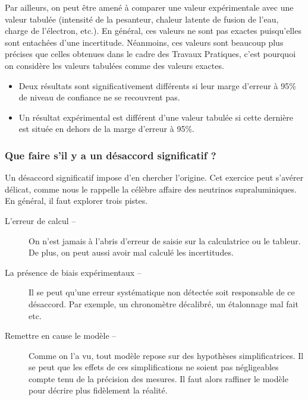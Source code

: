 Par ailleurs, on peut être amené à comparer une valeur expérimentale avec une valeur tabulée (intensité de la pesanteur, chaleur latente de fusion de l'eau, charge de l'électron, etc.). En général, ces valeurs ne sont pas exactes puisqu'elles sont entachées d'une incertitude. Néanmoins, ces valeurs sont beaucoup plus précises que celles obtenues dans le cadre des Travaux Pratiques, c'est pourquoi on considère les valeurs tabulées comme des valeurs exactes.
\begin{kaobox}[frametitle=À retenir]
\begin{itemize}
	\item Deux résultats sont significativement différents si leur marge d'erreur à 95\% de niveau de confiance ne se recouvrent pas.
	\item Un résultat expérimental est différent d'une valeur tabulée si cette dernière est située en dehors de la marge d'erreur à 95\%.
\end{itemize}
\end{kaobox}



\subsubsection{Que faire s'il y a un désaccord significatif ?}
Un désaccord significatif impose d'en chercher l'origine. Cet exercice peut s'avérer délicat, comme nous le rappelle la célèbre affaire des neutrinos supraluminiques. En général, il faut explorer trois pistes.
\begin{description}
	\item[L'erreur de calcul --] On n'est jamais à l'abris d'erreur de saisie sur la calculatrice ou le tableur. De plus, on peut aussi avoir mal calculé les incertitudes. 
	\item[La présence de biais expérimentaux --] Il se peut qu'une erreur systématique non détectée soit responsable de ce désaccord. Par exemple, un chronomètre décalibré, un étalonnage mal fait etc.
	\item[Remettre en cause le modèle --] Comme on l'a vu, tout modèle repose sur des hypothèses simplificatrices. Il se peut que les effets de ces simplifications ne soient pas négligeables compte tenu de la précision des mesures. Il faut alors raffiner le modèle pour décrire plus fidèlement la réalité.
\end{description}



